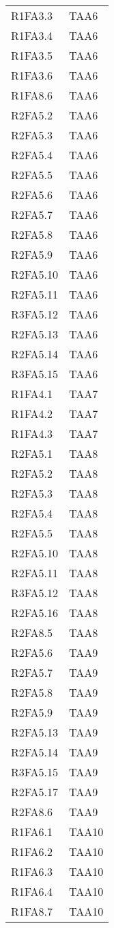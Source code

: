 {\begin{longtable}{C{4cm} C{4cm}}
R1FA3.3 & TAA6  \\
R1FA3.4 & TAA6  \\
R1FA3.5 & TAA6  \\
R1FA3.6 & TAA6  \\
R1FA8.6 & TAA6  \\
R2FA5.2 & TAA6  \\
R2FA5.3 & TAA6  \\
R2FA5.4 & TAA6  \\
R2FA5.5 & TAA6  \\
R2FA5.6 & TAA6  \\
R2FA5.7 & TAA6  \\
R2FA5.8 & TAA6  \\
R2FA5.9 & TAA6  \\
R2FA5.10 & TAA6  \\
R2FA5.11 & TAA6  \\
R3FA5.12 & TAA6  \\
R2FA5.13 & TAA6  \\
R2FA5.14 & TAA6  \\
R3FA5.15 & TAA6  \\

R1FA4.1 & TAA7  \\
R1FA4.2& TAA7  \\
R1FA4.3& TAA7  \\

R2FA5.1 & TAA8  \\
R2FA5.2 & TAA8  \\
R2FA5.3 & TAA8  \\
R2FA5.4 & TAA8  \\
R2FA5.5 & TAA8  \\
R2FA5.10 & TAA8  \\
R2FA5.11 & TAA8  \\
R3FA5.12 & TAA8  \\
R2FA5.16 & TAA8  \\
R2FA8.5 & TAA8  \\

R2FA5.6 & TAA9  \\
R2FA5.7 & TAA9  \\
R2FA5.8 & TAA9  \\
R2FA5.9 & TAA9  \\
R2FA5.13 & TAA9  \\
R2FA5.14 & TAA9  \\
R3FA5.15 & TAA9  \\
R2FA5.17 & TAA9  \\
R2FA8.6 & TAA9  \\

R1FA6.1 & TAA10  \\
R1FA6.2 & TAA10  \\
R1FA6.3 & TAA10  \\
R1FA6.4 & TAA10  \\
R1FA8.7 & TAA10  \\


\end{longtable}}
